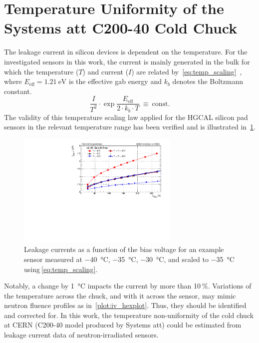 \section{Temperature Uniformity of the Systems att C200-40 Cold Chuck}
\label{appendix:chuck_temp}
The leakage current in silicon devices is dependent on the temperature.
For the investigated sensors in this work, the current is mainly generated in the bulk for which the temperature ($T$) and current ($I$) are related by~\ref{eq:temp_scaling}~\cite{Chilingarov_2013}, where $E_\text{eff}=\SI{1.21}{\electronvolt}$ is the effective gab energy and $k_b$ denotes the Boltzmann constant.
\begin{equation}
    \frac{I}{T^2}\cdot \exp{\frac{E_\text{eff}}{2\cdot k_b \cdot T}}~\equiv~\text{const.}
    \label{eq:temp_scaling}
\end{equation}
The validity of this temperature scaling law applied for the HGCAL silicon pad sensors in the relevant temperature range has been verified and is illustrated in~\ref{plot:iv_tempscaling}.
\begin{figure}[h]
	\centering
	\includegraphics[width=0.69\textwidth]{plots/iv_temp_scaling/iv_overlay_ch24.pdf}
	\caption{
		Leakage currents as a function of the bias voltage for an example sensor measured at \SI{-40}{\celsius}, \SI{-35}{\celsius}, \SI{-30}{\celsius}, and scaled to \SI{-35}{\celsius} using$~$\ref{eq:temp_scaling}.
		}
	\label{plot:iv_tempscaling}
	\end{figure}
Notably, a change by \SI{1}{\celsius} impacts the current by more than 10$~\%$. 
Variations of the temperature across the chuck, and with it across the sensor, may mimic neutron fluence profiles as in~\ref{plot:iv_hexplot}. 
Thus, they should be identified and corrected for.%
In this work, the temperature non-uniformity of the cold chuck at CERN (C200-40 model produced by Systems att) could be estimated from leakage current data of neutron-irradiated sensors.
